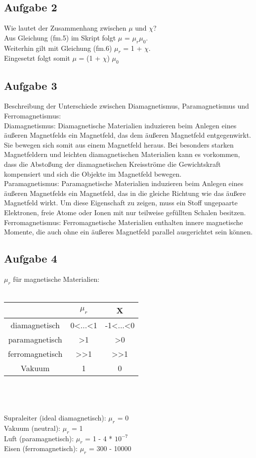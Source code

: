 \documentclass[a4paper,10pt]{scrartcl}
\begin{document}
\subsection{Aufgabe 2}
Wie lautet der Zusammenhang zwischen $\mu$ und $\chi$?\\
Aus Gleichung (fm.5) im Skript folgt $\mu$ = $\mu_r$$\mu_0$. \\
Weiterhin gilt mit Gleichung (fm.6) $\mu_r$ = 1 + $\chi$. \\
Eingesetzt folgt somit $\mu$ = (1 + $\chi$) $\mu_0$

\subsection{Aufgabe 3}
Beschreibung der Unterschiede zwischen Diamagnetismus, Paramagnetismus und Ferromagnetismus: \\
Diamagnetismus: Diamagnetische Materialien induzieren beim Anlegen eines äußeren Magnetfelds ein Magnetfeld, das dem äußeren Magnetfeld entgegenwirkt. Sie bewegen sich somit aus einem Magnetfeld heraus. Bei besonders starken Magnetfeldern und leichten diamagnetischen Materialien kann es vorkommen, dass die Abstoßung der diamagnetischen Kreisströme die Gewichtskraft kompensiert und sich die Objekte im Magnetfeld bewegen. \\
Paramagnetismus: Paramagnetische Materialien induzieren beim Anlegen eines äußeren Magnetfelds ein Magnetfeld, das in die gleiche Richtung wie das äußere Magnetfeld wirkt. Um diese Eigenschaft zu zeigen, muss ein Stoff ungepaarte Elektronen, freie Atome oder Ionen mit nur teilweise gefüllten Schalen besitzen. \\
Ferromagnetismus: Ferromagnetische Materialien enthalten innere magnetische Momente, die auch ohne ein äußeres Magnetfeld parallel ausgerichtet sein können.
\subsection{Aufgabe 4}
$\mu_r$ für magnetische Materialien: \\ \\
\begin{tabular}{|c|c|c|} \hline
	 & $\mu_r$ & X \\ \hline
	diamagnetisch & 0<...<1 & -1<...<0 \\ \hline
	paramagnetisch & >1 & >0 \\ \hline
	ferromagnetisch & >>1 & >>1 \\ \hline
	Vakuum & 1 & 0 \\ \hline
\end{tabular} \\ \\ \\
Supraleiter (ideal diamagnetisch): $\mu_r$ = 0 \\
Vakuum (neutral): $\mu_r$ = 1 \\
Luft (paramagnetisch):  $\mu_r$ = 1 - 4 * $10^{-7}$ \\
Eisen (ferromagnetisch):  $\mu_r$ = 300 - 10000 \\
\end{document}
